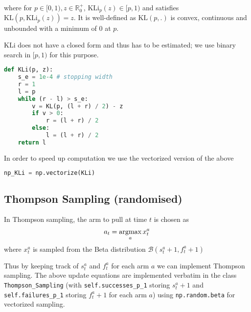 where for $p\in[0,1), z\in\mathbb{R}_0^+$, $\text{KLi}_p(z)\in[p, 1)$ and satisfies $\text{KL}(p, \text{KLi}_p(z)) = z$. It is well-defined as $\text{KL}(p,.)$ is convex, continuous and unbounded with a minimum of 0 at $p$.

$\text{KLi}$ does not have a closed form and thus has to be estimated; we use binary search in $[p, 1)$ for this purpose.

\begin{lstlisting}[language=python]
def KLi(p, z):
    s_e = 1e-4 # stopping width
    r = 1
    l = p
    while (r - l) > s_e:
        v = KL(p, (l + r) / 2) - z
        if v > 0:
            r = (l + r) / 2
        else:
            l = (l + r) / 2
    return l
\end{lstlisting}

In order to speed up computation we use the vectorized version of the above
\begin{lstlisting}[language=python]
np_KLi = np.vectorize(KLi)
\end{lstlisting}

\subsection{Thompson Sampling (randomised)}
In Thompson sampling, the arm to pull at time $t$ is chosen as
\begin{align*}
    a_t = \operatorname*{argmax}_{a} x_t^a
\end{align*}
where $x_t^a$ is sampled from the Beta distribution $\mathcal{B}(s_t^a + 1, f_t^a + 1)$

Thus by keeping track of $s_t^a$ and $f_t^a$ for each arm $a$ we can implement Thompson sampling. The above update equations are implemented verbatim in the class \lstinline{Thompson_Sampling} (with \lstinline{self.successes_p_1} storing $s_t^a + 1$  and \lstinline{self.failures_p_1} storing $f_t^a + 1$ for each arm $a$) using \lstinline{np.random.beta} for vectorized sampling.

